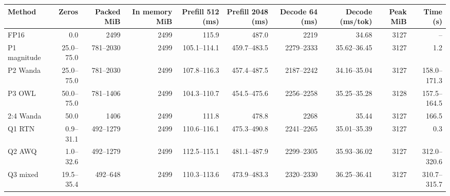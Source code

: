\scriptsize
\setlength{\tabcolsep}{3.5pt}
\label{tab:t1ressum}
\begin{adjustbox}{max width=\linewidth}
\begin{tabular}{lrrrrrrrrr}
\toprule
Method & Zeros & Packed MiB & In memory MiB & Prefill 512 (ms) & Prefill 2048 (ms) & Decode 64 (ms) & Decode (ms/tok) & Peak MiB & Time (s) \\
\midrule
FP16 & 0.0 & 2499 & 2499 & 115.9 & 487.0 & 2219 & 34.68 & 3127 & -- \\
P1 magnitude & 25.0--75.0 & 781--2030 & 2499 & 105.1--114.1 & 459.7--483.5 & 2279--2333 & 35.62--36.45 & 3127 & 1.2 \\
P2 Wanda & 25.0--75.0 & 781--2030 & 2499 & 107.8--116.3 & 457.4--487.5 & 2187--2242 & 34.16--35.04 & 3127 & 158.0--171.3 \\
P3 OWL & 50.0--75.0 & 781--1406 & 2499 & 104.3--110.7 & 454.5--475.6 & 2256--2258 & 35.25--35.28 & 3128 & 157.5--164.5 \\
2:4 Wanda & 50.0 & 1406 & 2499 & 111.8 & 478.8 & 2268 & 35.44 & 3127 & 166.5 \\
Q1 RTN & 0.9--31.1 & 492--1279 & 2499 & 110.6--116.1 & 475.3--490.8 & 2241--2265 & 35.01--35.39 & 3127 & 0.3 \\
Q2 AWQ & 1.0--32.6 & 492--1279 & 2499 & 112.5--115.1 & 481.1--487.9 & 2299--2305 & 35.93--36.02 & 3127 & 312.0--320.6 \\
Q3 mixed & 19.5--35.4 & 492--648 & 2499 & 110.3--113.6 & 473.9--483.3 & 2320--2330 & 36.25--36.41 & 3127 & 310.7--315.7 \\
\bottomrule
\end{tabular}
\end{adjustbox}

